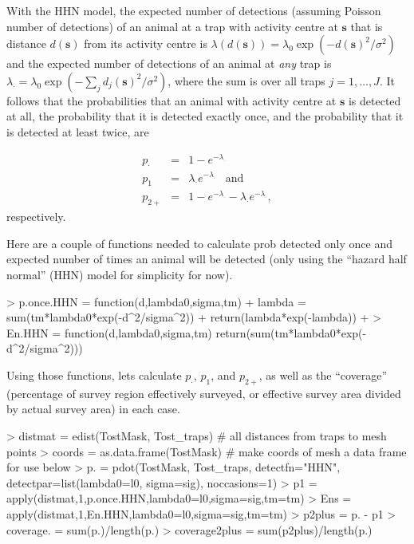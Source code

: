 \documentclass{article}
\begin{document}
With the HHN model, the expected number of detections (assuming Poisson number of detections) of an animal at a trap with activity centre at $\mathbf{s}$ that is distance $d(\mathbf{s})$ from its activity centre is $\lambda(d(\mathbf{s})) = \lambda_0\exp(-d(\mathbf{s})^2/\sigma^2)$ and the expected number of detections of an animal at \textit{any} trap is $\lambda_\cdot = \lambda_0\exp(-\sum_j d_j(\mathbf{s})^2/\sigma^2)$, where the sum is over all traps $j=1,\ldots,J$. It follows that the probabilities that an animal with activity centre at $\mathbf{s}$ is detected at all, the probability that it is detected exactly once, and the probability that it is detected at least twice, are

\begin{eqnarray}
p_\cdot &=& 1-e^{-\lambda_\cdot} \\
p_1 &=& \lambda_\cdot e^{-\lambda_\cdot}\;\;\;\mbox{and}\\
p_{2+}&=& 1-e^{-\lambda_\cdot} - \lambda_\cdot e^{-\lambda_\cdot},
\end{eqnarray}
\noindent
respectively.


Here are a couple of functions needed to calculate prob detected only once and expected number of times an animal will be detected (only using the ``hazard half normal'' (HHN) model for simplicity for now).

\begin{Schunk}
\begin{Sinput}
> p.once.HHN = function(d,lambda0,sigma,tm) {
+   lambda = sum(tm*lambda0*exp(-d^2/sigma^2))
+   return(lambda*exp(-lambda))
+ }
> En.HHN = function(d,lambda0,sigma,tm) return(sum(tm*lambda0*exp(-d^2/sigma^2)))
\end{Sinput}
\end{Schunk}

Using those functions, lets calculate $p_\cdot$, $p_1$, and $p_{2+}$, as well as the ``coverage'' (percentage of survey region effectively surveyed, or effective survey area divided by actual survey area) in each case.

\begin{Schunk}
\begin{Sinput}
> distmat =  edist(TostMask, Tost_traps) # all distances from traps to mesh points
> coords = as.data.frame(TostMask) # make coords of mesh a data frame for use below
> p. = pdot(TostMask, Tost_traps, detectfn="HHN", detectpar=list(lambda0=l0, sigma=sig), noccasions=1) 
> p1 = apply(distmat,1,p.once.HHN,lambda0=l0,sigma=sig,tm=tm)
> Ens = apply(distmat,1,En.HHN,lambda0=l0,sigma=sig,tm=tm)
> p2plus = p. - p1
> coverage. = sum(p.)/length(p.)
> coverage2plus = sum(p2plus)/length(p.)
\end{Sinput}
\end{Schunk}
\end{document}
